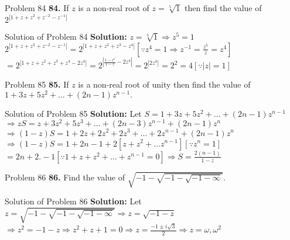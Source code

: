 \documentclass[aspectratio=169,8pt]{beamer}
\begin{document}
\begin{frame}{Problem 84}
  \textbf{84.} If $z$ is a non-real root of $z = \sqrt[5]{1}$ then find the value of $2^{|1 + z + z^2 + z^{-2} - z^{-1}|}$
\end{frame}
\begin{frame}{Solution of Problem 84}
  \textbf{Solution:} $z = \sqrt[5]{1} \Rightarrow z^5 = 1$\\
  \vspace*{0.2cm}
  $2^{|1 + z + z^2 + z^{-2} - z^{-1}|} = 2^{|1 + z + z^2 + z^3 - z^4|}[\because z^4 = 1 \Rightarrow z^{-1} = \frac{z^5}{z} = z^4]$\\
  \vspace*{0.2cm}
  $= 2^{|1 + z + z^2 + z^3 + z^4 - 2z^4|} = 2^{\left|\frac{1 - z^5}{1 - z} - 2z^4\right|} = 2^{|2z^4|} = 2^2 = 4[\because |z| = 1]$
\end{frame}
\begin{frame}{Problem 85}
  \textbf{85.} If $z$ is a non-real root of unity then find the value of $1 + 3z + 5z^2 + \ldots + (2n - 1)z^{n - 1}.$
\end{frame}
\begin{frame}{Solution of Problem 85}
  \textbf{Solution:} Let $S = 1 + 3z + 5z^2 + \ldots + (2n - 1)z^{n - 1}$\\
  \vspace*{0.2cm}
  $\Rightarrow zS = z + 3z^2 + 5z^3 + \ldots + (2n - 3)z^{n - 1} + (2n - 1)z^n$\\
  \vspace*{0.2cm}
  $\Rightarrow (1 - z)S = 1 + 2z + 2z^2 + 2z^3 + \ldots + 2z^{n - 1} + (2n - 1)z^n$\\
  \vspace*{0.2cm}
  $\Rightarrow (1 - z)S = 1 + 2n - 1 + 2[z + z^2 + \ldots z^{n - 1}][\because z^n = 1]$\\
  \vspace*{0.2cm}
  $= 2n + 2.-1[\because 1 + z + z^2 + \ldots + z^{n - 1} = 0] \Rightarrow S = \frac{2(n - 1)}{1 - z}$
\end{frame}
\begin{frame}{Problem 86}
  \textbf{86.} Find the value of $\sqrt{-1-\sqrt{-1-\sqrt{-1-\infty}}}.$
\end{frame}
\begin{frame}{Solution of Problem 86}
  \textbf{Solution:} Let $z = \sqrt{-1-\sqrt{-1-\sqrt{-1-\infty}}} \Rightarrow z = \sqrt{-1 - z}$\\
  \vspace*{0.2cm}
  $\Rightarrow z^2 = -1 - z \Rightarrow z^2 + z + 1 = 0 \Rightarrow z = \frac{-1 \pm i\sqrt{3}}{2} \Rightarrow z = \omega, \omega^2$
\end{frame}
\end{document}
